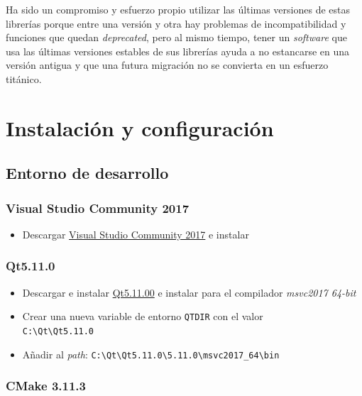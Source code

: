 Ha sido un compromiso y esfuerzo propio utilizar las últimas versiones de estas librerías porque entre una versión y otra hay problemas de incompatibilidad y funciones que quedan \textit{deprecated}, pero al mismo tiempo, tener un \textit{software} que usa las últimas versiones estables de sus librerías ayuda a no estancarse en una versión antigua y que una futura migración no se convierta en un esfuerzo titánico.

\section{Instalación y configuración}

\subsection{Entorno de desarrollo}

\subsubsection{Visual Studio Community 2017}

\begin{itemize}
	\item Descargar \href{https://www.visualstudio.com/es-es/downloads/download-visual-studio-vs.aspx}{Visual Studio Community 2017} e instalar
\end{itemize}

\subsubsection{Qt5.11.0}

\begin{itemize}
	\item Descargar e instalar \href{http://download.qt.io/official_releases/qt/5.11/5.11.0/qt-opensource-windows-x86-5.11.0.exe}{Qt5.11.00} e instalar para el compilador \textit{msvc2017 64-bit}
	\item Crear una nueva variable de entorno \texttt{QTDIR} con el valor \\ \texttt{C:\textbackslash Qt\textbackslash Qt5.11.0}
	\item Añadir al \textit{path}: \texttt{C:\textbackslash Qt\textbackslash Qt5.11.0\textbackslash 5.11.0\textbackslash msvc2017\_64\textbackslash bin}
\end{itemize}

\subsubsection{CMake 3.11.3}


